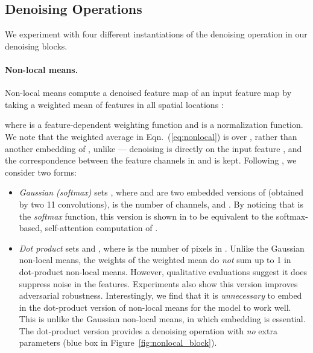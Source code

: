 \documentclass[10pt,twocolumn,letterpaper]{article}
\begin{document}
\subsection{Denoising Operations}

We experiment with four different instantiations of the denoising operation in our denoising blocks.

\paragraph{Non-local means.}
Non-local means \cite{Buades2005} compute a denoised feature map  of an input feature map  by taking a weighted mean of features in all spatial locations :

where  is a feature-dependent weighting function and  is a normalization function. 
We note that the weighted average in Eqn.~(\ref{eq:nonlocal}) is over , rather than another embedding of , unlike \cite{Vaswani2017,Wang2018} --- denoising is directly on the input feature , and the correspondence between the feature channels in  and  is kept.
Following \cite{Wang2018}, we consider two forms: 
\begin{itemize}
\vspace{-.5em}
\item \emph{Gaussian (softmax)} sets , where  and  are two embedded versions of  (obtained by two 11 convolutions),  is the number of channels, and . By noticing that  is the \emph{softmax} function, this version is shown in \cite{Wang2018} to be equivalent to the softmax-based, self-attention computation of \cite{Vaswani2017}.

\vspace{-.5em}
\item \emph{Dot product} sets  and , where  is the number of pixels in . Unlike the Gaussian non-local means, the weights of the weighted mean do \emph{not} sum up to 1 in dot-product non-local means. However, qualitative evaluations suggest it does suppress noise in the features. Experiments also show this version improves adversarial robustness.
Interestingly, we find that it is \emph{unnecessary} to embed  in the dot-product version of non-local means for the model to work well. This is unlike the Gaussian non-local means, in which embedding is essential. The dot-product version provides a denoising operation with \emph{no} extra parameters (blue box in Figure~\ref{fig:nonlocal_block}).

\end{itemize}
\end{document}
